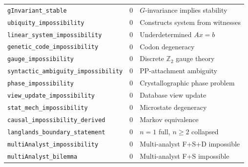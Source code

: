 \documentclass[11pt,a4paper]{article}
\begin{document}
\begin{table}[ht]
\begin{tabular}{@{}lrl@{}}
\texttt{gInvariant\_stable} & 0 & $G$-invariance implies stability \\
\texttt{ubiquity\_impossibility} & 0 & Constructs system from witnesses \\
\texttt{linear\_system\_impossibility} & 0 & Underdetermined $Ax=b$ \\
\texttt{genetic\_code\_impossibility} & 0 & Codon degeneracy \\
\texttt{gauge\_impossibility} & 0 & Discrete $\mathbb{Z}_2$ gauge theory \\
\texttt{syntactic\_ambiguity\_impossibility} & 0 & PP-attachment ambiguity \\
\texttt{phase\_impossibility} & 0 & Crystallographic phase problem \\
\texttt{view\_update\_impossibility} & 0 & Database view update \\
\texttt{stat\_mech\_impossibility} & 0 & Microstate degeneracy \\
\texttt{causal\_impossibility\_derived} & 0 & Markov equivalence \\
\texttt{langlands\_boundary\_statement} & 0 & $n{=}1$ full, $n{\geq}2$ collapsed \\
\texttt{multiAnalyst\_impossibility} & 0 & Multi-analyst F+S+D impossible \\
\texttt{multiAnalyst\_bilemma} & 0 & Multi-analyst F+S impossible \\
\bottomrule
\end{tabular}
\end{table}
\end{document}
